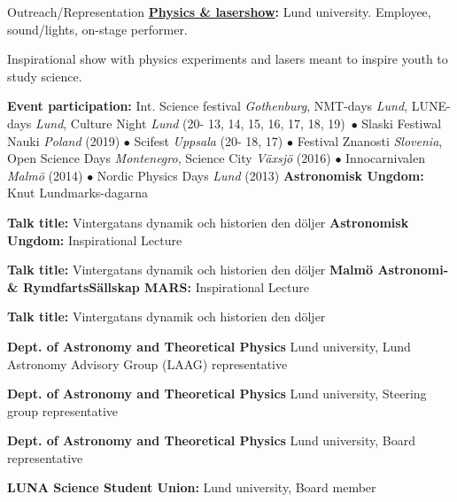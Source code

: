 \begin{rubric}{Outreach/Representation}
\entry*[2013 - current]%
\textbf{\href{https://www.facebook.com/Physicsandlasershow}{Physics \& lasershow}:} Lund university. Employee, sound/lights, on-stage performer. \par Inspirational show with physics experiments and lasers meant to inspire youth to study science. \par
\textbf{Event participation:} Int. Science festival \textit{Gothenburg}, NMT-days \textit{Lund}, LUNE-days \textit{Lund}, Culture Night \textit{Lund} (20- 13, 14, 15, 16, 17, 18, 19)\ $\bullet$ Slaski Festiwal Nauki \textit{Poland} (2019)  $\bullet$ Scifest \textit{Uppsala} (20- 18, 17) $\bullet$ Festival Znanosti \textit{Slovenia}, Open Science Days \textit{Montenegro}, Science City \textit{Växsjö} (2016) $\bullet$ Innocarnivalen \textit{Malmö} (2014) $\bullet$ Nordic Physics Days \textit{Lund} (2013)
\entry*[2021]
%
\textbf{Astronomisk Ungdom:} Knut Lundmarks-dagarna \par 
\textbf{Talk title:} Vintergatans dynamik och historien den döljer
\entry*[2020]
%
\textbf{Astronomisk Ungdom:} Inspirational Lecture \par 
\textbf{Talk title:} Vintergatans dynamik och historien den döljer
\entry*[2020]
%
\textbf{Malmö Astronomi- \& RymdfartsSällskap MARS:} Inspirational Lecture \par 
\textbf{Talk title:} Vintergatans dynamik och historien den döljer

\entry*[2020-2021]%
\textbf{Dept. of Astronomy and Theoretical Physics} Lund university, Lund Astronomy Advisory Group (LAAG) representative \par
\entry*[2020-2021]%
\textbf{Dept. of Astronomy and Theoretical Physics} Lund university, Steering group representative \par
\entry*[2017-2018]%
\textbf{Dept. of Astronomy and Theoretical Physics} Lund university, Board representative \par
\entry*[2013-2015]%
\textbf{LUNA Science Student Union:} Lund university, Board member \par

\end{rubric}